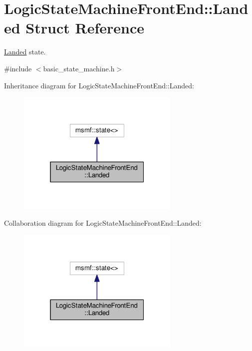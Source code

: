 \hypertarget{structLogicStateMachineFrontEnd_1_1Landed}{\section{Logic\-State\-Machine\-Front\-End\-:\-:Landed Struct Reference}
\label{structLogicStateMachineFrontEnd_1_1Landed}
}


\hyperlink{structLogicStateMachineFrontEnd_1_1Landed}{Landed} state.  




{\ttfamily \#include $<$basic\-\_\-state\-\_\-machine.\-h$>$}



Inheritance diagram for Logic\-State\-Machine\-Front\-End\-:\-:Landed\-:\nopagebreak
\begin{figure}[H]
\begin{center}
\leavevmode
\includegraphics[width=220pt]{structLogicStateMachineFrontEnd_1_1Landed__inherit__graph}
\end{center}
\end{figure}


Collaboration diagram for Logic\-State\-Machine\-Front\-End\-:\-:Landed\-:\nopagebreak
\begin{figure}[H]
\begin{center}
\leavevmode
\includegraphics[width=220pt]{structLogicStateMachineFrontEnd_1_1Landed__coll__graph}
\end{center}
\end{figure}
